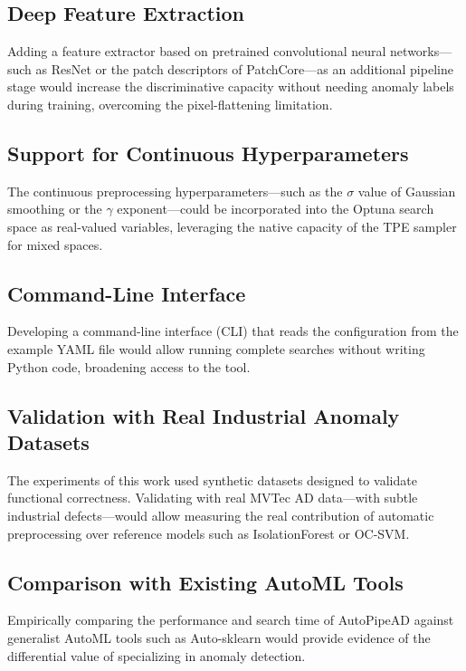 \documentclass[conference]{IEEEtran}
\begin{document}
\subsection{Deep Feature Extraction}

Adding a feature extractor based on pretrained convolutional neural
networks—such as ResNet or the patch descriptors of PatchCore—as an additional
pipeline stage would increase the discriminative capacity without needing
anomaly labels during training, overcoming the pixel-flattening limitation.

\subsection{Support for Continuous Hyperparameters}

The continuous preprocessing hyperparameters—such as the $\sigma$ value of
Gaussian smoothing or the $\gamma$ exponent—could be incorporated into the
Optuna search space as real-valued variables, leveraging the native capacity of
the TPE sampler for mixed spaces.

\subsection{Command-Line Interface}

Developing a command-line interface (CLI) that reads the configuration from the
example YAML file would allow running complete searches without writing Python
code, broadening access to the tool.

\subsection{Validation with Real Industrial Anomaly Datasets}

The experiments of this work used synthetic datasets designed to validate
functional correctness. Validating with real MVTec AD data—with subtle
industrial defects—would allow measuring the real contribution of automatic
preprocessing over reference models such as IsolationForest or OC-SVM.

\subsection{Comparison with Existing AutoML Tools}

Empirically comparing the performance and search time of AutoPipeAD against
generalist AutoML tools such as Auto-sklearn would provide evidence of the
differential value of specializing in anomaly detection.
\end{document}
